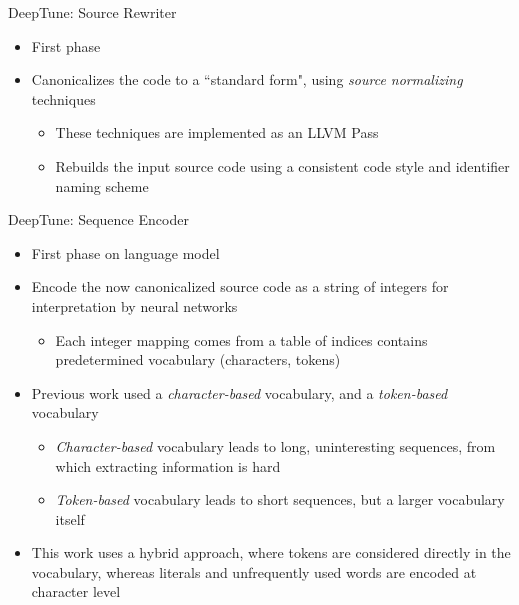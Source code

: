 \documentclass[10pt]{beamer}
\begin{document}
\begin{frame}{DeepTune: Source Rewriter}
\begin{itemize}
\item<1->{First phase}
\item<2->{Canonicalizes the code to a ``standard form", using \emph{source normalizing} techniques
         \begin{itemize}
         \item<2->{These techniques are implemented as an LLVM Pass}
         \item<3->{Rebuilds the input source code using a consistent code style and identifier naming scheme}
         \end{itemize}}
\end{itemize}
\end{frame}

\begin{frame}{DeepTune: Sequence Encoder}
\begin{itemize}
\item<1->{First phase on language model}
\item<2->{Encode the now canonicalized source code as a string of integers for interpretation by neural networks
          \begin{itemize}
          \item<3->{Each integer mapping comes from a table of indices contains predetermined vocabulary (characters, tokens)}
          \end{itemize}}
\item<4->{Previous work used a \emph{character-based} vocabulary, and a \emph{token-based} vocabulary
          \begin{itemize}
          \item<5->{\emph{Character-based} vocabulary leads to long, uninteresting sequences, from which extracting information is hard}
          \item<6->{\emph{Token-based} vocabulary leads to short sequences, but a larger vocabulary itself}
          \end{itemize}}
\item<7->{This work uses a hybrid approach, where tokens are considered directly in the vocabulary, whereas literals and unfrequently used words are encoded at character level}
\end{itemize}
\end{frame}
\end{document}
